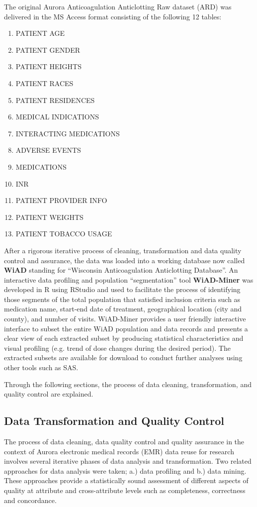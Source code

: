 \documentclass{article}
\begin{document}
The original Aurora Anticoagulation Anticlotting Raw dataset (ARD) was delivered in the MS Access format consisting of the following 12 tables:
\begin{enumerate}
  \item PATIENT AGE
  \item PATIENT GENDER
  \item PATIENT HEIGHTS
  \item PATIENT RACES
  \item PATIENT RESIDENCES
  \item MEDICAL INDICATIONS
  \item INTERACTING MEDICATIONS
  \item ADVERSE EVENTS
  \item MEDICATIONS
  \item INR
  \item PATIENT PROVIDER INFO
  \item PATIENT WEIGHTS
  \item PATIENT TOBACCO USAGE
\end{enumerate}

After a rigorous iterative process of cleaning, transformation and data quality control and assurance, the data was loaded into a working database now called \textbf{WiAD} standing for ``Wisconsin Anticoagulation Anticlotting Database''.  An interactive data profiling and population ``segmentation'' tool \textbf{WiAD-Miner} was developed in R using RStudio and used to facilitate the process of identifying those segments of the total population that satisfied inclusion criteria such as medication name, start-end date of treatment, geographical location (city and county), and number of visits. WiAD-Miner provides a user friendly interactive interface to subset the entire WiAD population and data records and presents a clear view of each extracted subset by producing statistical characteristics and visual profiling (e.g. trend of dose changes during the desired period). The extracted subsets are available for download to conduct further analyses using other tools such as SAS. 

Through the following sections, the process of data cleaning, transformation, and quality control are explained.

\subsection{Data Transformation and Quality Control}
The process of data cleaning, data quality control and quality assurance in the context of Aurora electronic medical records (EMR) data reuse for research involves several iterative phases of data analysis and transformation.  Two related approaches for data analysis were taken; a.) data profiling and b.) data mining.  These approaches provide a statistically sound assessment of different aspects of quality at attribute and cross-attribute levels such as completeness, correctness and concordance.
\end{document}
